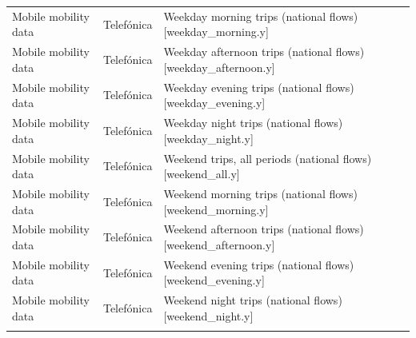 \begin{landscape}
\begin{longtable}[t]{>{\raggedright\arraybackslash}p{3.4cm}>{\raggedright\arraybackslash}p{5.6cm}>{\raggedright\arraybackslash}p{12.4cm}}
Mobile mobility data & Telefónica & Weekday morning trips (national flows) [weekday\_morning.y]\\
Mobile mobility data & Telefónica & Weekday afternoon trips (national flows) [weekday\_afternoon.y]\\
Mobile mobility data & Telefónica & Weekday evening trips (national flows) [weekday\_evening.y]\\
Mobile mobility data & Telefónica & Weekday night trips (national flows) [weekday\_night.y]\\
Mobile mobility data & Telefónica & Weekend trips, all periods (national flows) [weekend\_all.y]\\
Mobile mobility data & Telefónica & Weekend morning trips (national flows) [weekend\_morning.y]\\
Mobile mobility data & Telefónica & Weekend afternoon trips (national flows) [weekend\_afternoon.y]\\
Mobile mobility data & Telefónica & Weekend evening trips (national flows) [weekend\_evening.y]\\
Mobile mobility data & Telefónica & Weekend night trips (national flows) [weekend\_night.y]\\*\\
\end{longtable}
\endgroup{}
\end{landscape}

